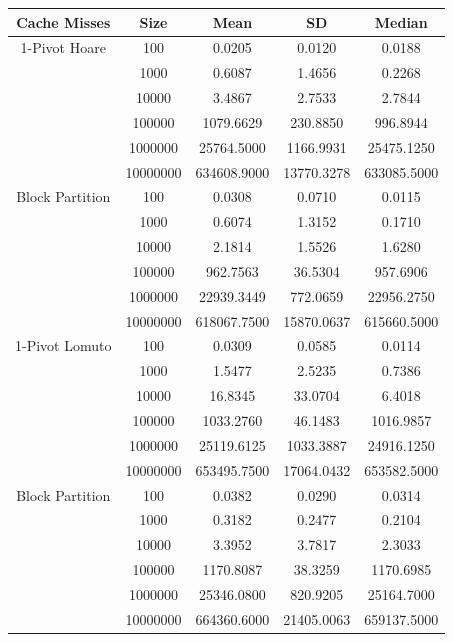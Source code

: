 \documentclass[a4paper,oneside,12pt]{book}
\begin{document}
\begin{center}
    \vspace{2em}
    \small
    \begin{tabular}{ |c c | c c c| }
        \hline
        Cache Misses    & Size     & Mean           & SD            & Median \\
        \hline
        1-Pivot Hoare   & 100      & 0.0205         & 0.0120        & 0.0188 \\
                        & 1000     & 0.6087         & 1.4656        & 0.2268 \\
                        & 10000    & 3.4867         & 2.7533        & 2.7844 \\
                        & 100000   & 1079.6629      & 230.8850      & 996.8944 \\
                        & 1000000  & 25764.5000     & 1166.9931     & 25475.1250 \\
                        & 10000000 & 634608.9000    & 13770.3278    & 633085.5000 \\
        Block Partition & 100      & 0.0308         & 0.0710        & 0.0115 \\
                        & 1000     & 0.6074         & 1.3152        & 0.1710 \\
                        & 10000    & 2.1814         & 1.5526        & 1.6280 \\
                        & 100000   & 962.7563       & 36.5304       & 957.6906 \\
                        & 1000000  & 22939.3449     & 772.0659      & 22956.2750 \\
                        & 10000000 & 618067.7500    & 15870.0637    & 615660.5000 \\
        \hline
        1-Pivot Lomuto  & 100      & 0.0309         & 0.0585        & 0.0114 \\
                        & 1000     & 1.5477         & 2.5235        & 0.7386 \\
                        & 10000    & 16.8345        & 33.0704       & 6.4018 \\
                        & 100000   & 1033.2760      & 46.1483       & 1016.9857 \\
                        & 1000000  & 25119.6125     & 1033.3887     & 24916.1250 \\
                        & 10000000 & 653495.7500    & 17064.0432    & 653582.5000 \\
        Block Partition & 100      & 0.0382         & 0.0290        & 0.0314 \\
                        & 1000     & 0.3182         & 0.2477        & 0.2104 \\
                        & 10000    & 3.3952         & 3.7817        & 2.3033 \\
                        & 100000   & 1170.8087      & 38.3259       & 1170.6985 \\
                        & 1000000  & 25346.0800     & 820.9205      & 25164.7000 \\
                        & 10000000 & 664360.6000    & 21405.0063    & 659137.5000 \\
        \hline
    \end{tabular}


\end{center}
\end{document}

